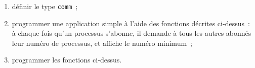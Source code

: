 \begin {enumerate}

    \item définir le type {\tt comm}~;

    \item programmer une application simple à l'aide des fonctions
	décrites ci-dessus~: à chaque fois qu'un processus s'abonne, il
	demande à tous les autres abonnés leur numéro de processus, et
	affiche le numéro minimum~;
    
    \item programmer les fonctions ci-dessus.

\end {enumerate}



